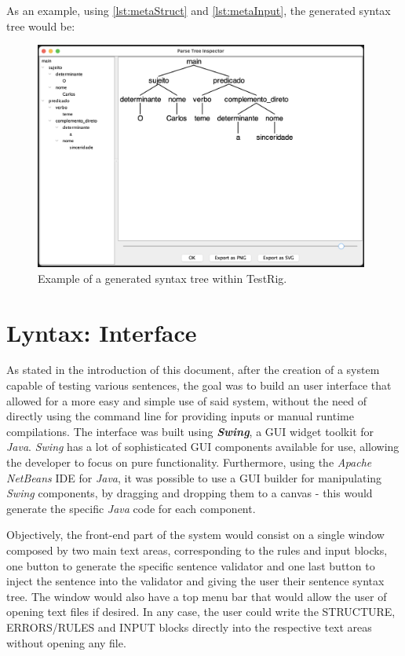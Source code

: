 \noindent As an example, using \autoref{lst:metaStruct} and \autoref{lst:metaInput}, the generated syntax tree would be:
\begin{figure}[h]
    \centering
    \includegraphics[width=11cm]{images/testrig_gui_example.png}
    \caption{Example of a generated syntax tree within TestRig.}
    \label{fig:testrigGuiExample}
\end{figure}

\newpage
\section{Lyntax: Interface}

As stated in the introduction of this document, after the creation of a system capable of testing various sentences, the goal was to build an user interface
that allowed for a more easy and simple use of said system, without the need of directly using the command line for providing inputs or manual runtime compilations.
The interface was built using \emph{\textbf{Swing}}, a GUI widget toolkit for \emph{Java}.
\emph{Swing} has a lot of sophisticated GUI components available for use, allowing the developer to focus on pure functionality.
Furthermore, using the \emph{Apache NetBeans} IDE for \emph{Java}, it was possible to use a GUI builder for manipulating \emph{Swing} components, 
by dragging and dropping them to a canvas - this would generate the specific \emph{Java} code for each component.

Objectively, the front-end part of the system would consist on a single window composed by two main text areas, corresponding to the rules and input blocks,
one button to generate the specific sentence validator and one last button to inject the sentence into the validator and giving the user their sentence syntax tree.
The window would also have a top menu bar that would allow the user of opening text files if desired.
In any case, the user could write the STRUCTURE, ERRORS/RULES and INPUT blocks directly into the respective text areas without opening any file. 

